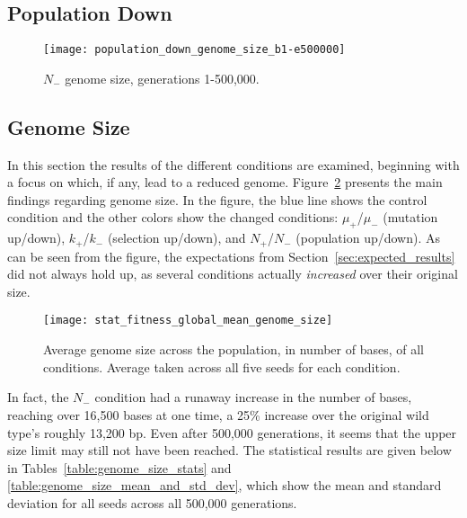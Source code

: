 \subsection{Population Down}

\begin{figure}[H]
	\centering
	\texttt{[image: population\_down\_genome\_size\_b1-e500000]}
	\caption[Population down genome size]{$N_-$ genome size, generations 1-500,000.}
	\label{fig:pop_down_genome_size}
\end{figure}

\subsection{Genome Size}\label{sec:genome_size}

In this section the results of the different conditions are examined, beginning with a focus on which, if any, lead to a reduced genome. Figure~\ref{fig:genome_size} presents the main findings regarding genome size. In the figure, the blue line shows the control condition and the other colors show the changed conditions: $\mu_+$/$\mu_-$ (mutation up/down), $k_+$/$k_-$ (selection up/down), and $N_+$/$N_-$ (population up/down). As can be seen from the figure, the expectations from Section~\ref{sec:expected_results} did not always hold up, as several conditions actually \textit{increased} over their original size. 
\begin{figure}[H]
	\centering
	\texttt{[image: stat\_fitness\_global\_mean\_genome\_size]}
	\caption[Genome size]{Average genome size across the population, in number of bases, of all conditions. Average taken across all five seeds for each condition.}
	\label{fig:genome_size}
\end{figure}
In fact, the $N_-$ condition had a runaway increase in the number of bases, reaching over 16,500 bases at one time, a 25\% increase over the original wild type's roughly 13,200 bp. Even after 500,000 generations, it seems that the upper size limit may still not have been reached. The statistical results are given below in Tables~\ref{table:genome_size_stats} and \ref{table:genome_size_mean_and_std_dev}, which show the mean and standard deviation for all seeds across all 500,000 generations. 


